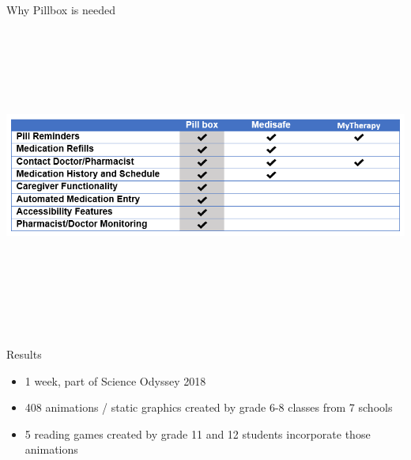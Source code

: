 \documentclass[22pt]{beamer}
\begin{document}
\begin{frame}[fragile]
\begin{textblock}{7.25}
\begin{block}{Why Pillbox is needed}
\includegraphics[height=10.5cm]{CompetitiveAdvantage.png}

\end{block}


\begin{block}{Results}
\begin{itemize}
\item 1 week, part of Science Odyssey 2018
\item 408 animations / static graphics created by grade 6-8 classes from 7 schools
\item 5 reading games created by grade 11 and 12 students incorporate those animations
\end{itemize}


\end{block}
\end{textblock}
\end{frame}
\end{document}
